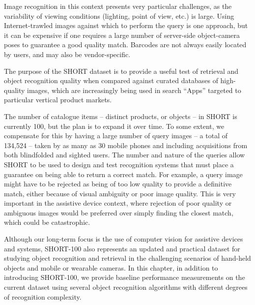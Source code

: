 Image recognition in this context presents very particular challenges, as the variability of viewing conditions (lighting, point of view, etc.) is large. Using Internet-trawled images against which to perform the query is one approach, but it can be expensive if one requires a large number of server-side object-camera poses to guarantee a good quality match. Barcodes are not always easily located by users, and may also be vendor-specific. 


The purpose of the SHORT dataset is to provide a useful test of retrieval and object recognition quality when compared against curated databases of high-quality images, which are increasingly being used in search ``Apps'' targeted to particular vertical product markets. 



The number of catalogue items -- distinct products, or objects -- in SHORT is currently 100, but the plan is to expand it over time. To some extent, we compensate for this by having a large number of query images -- a total of 134,524 -- taken by as many as 30 mobile phones and including acquisitions from both blindfolded and sighted users. The number and nature of the queries allow SHORT to be used to design and test recognition systems that must place a guarantee on being able to return a correct match. For example, a query image might have to be rejected as being of too low quality to provide a definitive match, either because of visual ambiguity or poor image quality. This is very important in the assistive device context, where rejection of poor quality or ambiguous images would be preferred over simply finding the closest match, which could be catastrophic.

Although our long-term focus is the use of computer vision for assistive devices and systems, SHORT-100 also represents an updated and practical dataset for studying object recognition and retrieval in the challenging scenarios of hand-held objects and mobile or wearable cameras. In this chapter, in addition to introducing SHORT-100, we provide baseline performance measurements on the current dataset using several object recognition algorithms with different degrees of recognition complexity.

